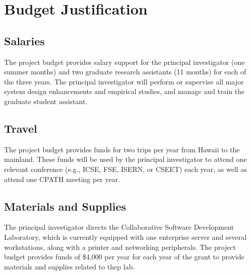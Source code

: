 

\section*{Budget Justification}

\renewcommand{\thepage} {F--\arabic{page}}

\subsection*{Salaries}

The project budget provides salary support for the principal investigator
(one summer months) and two graduate research
assistants (11 months) for each of the three years.  The principal
investigator will perform or supervise all major system design enhancements
and empirical studies, and manage and train the graduate student
assistant.

\subsection*{Travel}

The project budget provides funds for two trips per year from Hawaii to the
mainland.  These funds will be used by the principal investigator to attend
one relevant conference (e.g., ICSE, FSE, ISERN, or CSEET) each year, as well 
as attend one CPATH meeting per year. 

\subsection*{Materials and Supplies}

The principal investigator directs the Collaborative Software Development
Laboratory, which is currently equipped with one enterprise server and several
workstations, along with a printer and networking peripherals.  The project
budget provides funds of \$4,000 per year for each year of the grant to
provide materials and supplies related to thep lab.

